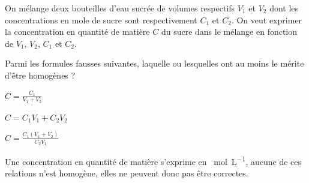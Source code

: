 \newpage


\hauteurLargeurCadreReponse		{7mm}{4cm}
\initialisationEntrainement

\debutEntrainement

On mélange deux bouteilles d'eau sucrée de volumes respectifs $V_1$ et $V_2$ dont les concentrations en mole de sucre sont respectivement $C_1$ et $C_2$. On veut exprimer la concentration en quantité de matière $C$ du sucre dans le mélange en fonction de $V_1$, $V_2$, $C_1$ et $C_2$.


\begin{enonce}
Parmi les formules fausses suivantes, laquelle ou lesquelles ont au moins le mérite d'être homogènes ?
\begin{listeQCM1Colonne}
	\item $C=\frac{C_1}{V_1+V_2}$
	\item $C = C_1V_1+C_2V_2$
	\item $C=\frac{C_1(V_1+V_2)}{C_2V_1}$
	\end{listeQCM1Colonne}		
\end{enonce}




\begin{corrige}
Une concentration en quantité de matière s'exprime en \SI{}{\mole\per\liter}, aucune de ces relations n'est homogène, elles ne peuvent donc pas être correctes.
\end{corrige}


